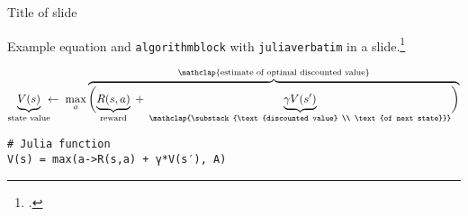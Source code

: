 \begin{frame}[fragile]{Title of slide}

Example equation and \texttt{algorithmblock} with \texttt{juliaverbatim} in a slide.\footcite{Kochenderfer2019}

\begin{equation*}
\underbrace{V(s)}_{\text{state value}} \!\!\! \leftarrow \;
\max\limits_a \overbrace{\biggl(
\underbrace{R(s,a)}_{\text{reward}} \; + \;
\underbrace{\gamma V(s^\prime)}_{\mathclap{\substack{\text{discounted value} \\ \text{of next state}}}}
\biggr)}^{\mathclap{\text{estimate of optimal discounted value}}}
\end{equation*}

\begin{algorithmblock}
\begin{verbatim}
# Julia function
V(s) = max(a->R(s,a) + γ*V(s′), A)
\end{verbatim}
\end{algorithmblock}

\end{frame}